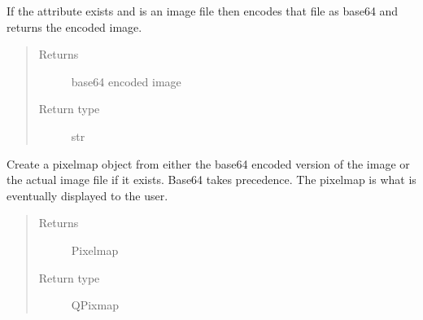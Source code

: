 \documentclass[letterpaper,10pt,english]{sphinxmanual}
\begin{document}
\begin{fulllineitems}
\begin{fulllineitems}
\end{fulllineitems}


\begin{fulllineitems}
\label{\detokenize{polo.crystallography:polo.crystallography.image.Image.encode_base64}}
If the  attribute exists and is an image file then encodes
that file as base64 and returns the encoded image.
\begin{quote}\begin{description}
\item[{Returns}] \leavevmode
base64 encoded image

\item[{Return type}] \leavevmode
str

\end{description}\end{quote}

\end{fulllineitems}


\begin{fulllineitems}
\label{\detokenize{polo.crystallography:polo.crystallography.image.Image.get_pixel_map}}
Create a pixelmap object from either the base64 encoded version
of the image or the actual image file if it exists. Base64 takes
precedence. The pixelmap is what is eventually displayed to the user.
\begin{quote}\begin{description}
\item[{Returns}] \leavevmode
Pixelmap

\item[{Return type}] \leavevmode
QPixmap

\end{description}\end{quote}

\end{fulllineitems}



\end{fulllineitems}
\end{document}
